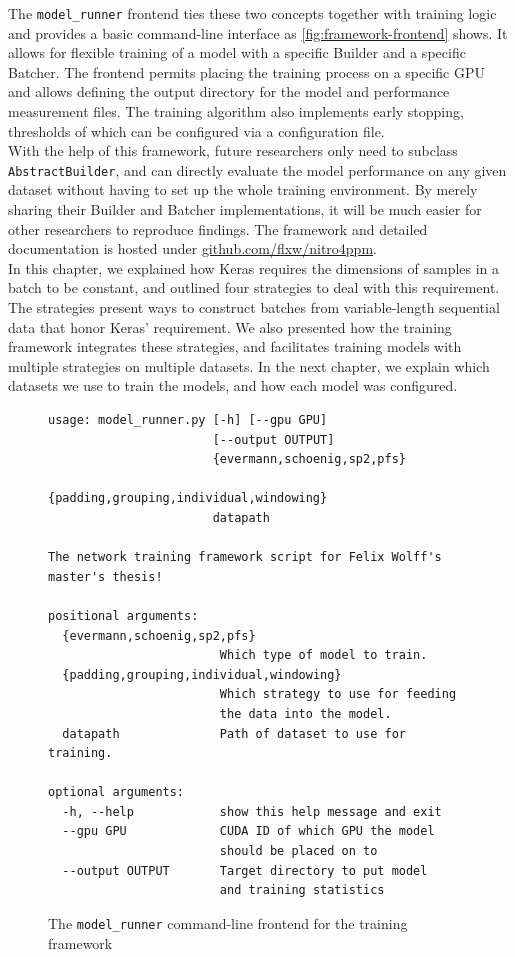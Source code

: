 \noindent The \verb=model_runner= frontend ties these two concepts together with training logic and provides a basic command-line interface as \autoref{fig:framework-frontend} shows. It allows for flexible training of a model with a specific Builder and a specific Batcher. The frontend permits placing the training process on a specific GPU and allows defining the output directory for the model and performance measurement files. The training algorithm also implements early stopping, thresholds of which can be configured via a configuration file.\\

With the help of this framework, future researchers only need to subclass \verb=AbstractBuilder=, and can directly evaluate the model performance on any given dataset without having to set up the whole training environment. By merely sharing their Builder and Batcher implementations, it will be much easier for other researchers to reproduce findings. The framework and detailed documentation is hosted under \href{https://github.com/flxw/nitro4ppm}{github.com/flxw/nitro4ppm}.\\

In this chapter, we explained how Keras requires the dimensions of samples in a batch to be constant,
and outlined four strategies to deal with this requirement.
The strategies present ways to construct batches from variable-length sequential data that honor Keras' requirement.
We also presented how the training framework integrates these strategies, and
facilitates training models with multiple strategies on multiple datasets.
In the next chapter, we explain which datasets we use to train the models,
and how each model was configured.

\begin{figure}[!htb]
\centering
\begin{verbatim}
usage: model_runner.py [-h] [--gpu GPU]
                       [--output OUTPUT]
                       {evermann,schoenig,sp2,pfs}
                       {padding,grouping,individual,windowing}
                       datapath

The network training framework script for Felix Wolff's master's thesis!

positional arguments:
  {evermann,schoenig,sp2,pfs}
                        Which type of model to train.
  {padding,grouping,individual,windowing}
                        Which strategy to use for feeding
                        the data into the model.
  datapath              Path of dataset to use for training.

optional arguments:
  -h, --help            show this help message and exit
  --gpu GPU             CUDA ID of which GPU the model
                        should be placed on to
  --output OUTPUT       Target directory to put model
                        and training statistics
\end{verbatim}
\caption[CLI frontend for the framework]{The \texttt{model\_runner} command-line frontend for the training framework}
\label{fig:framework-frontend}
\end{figure}
